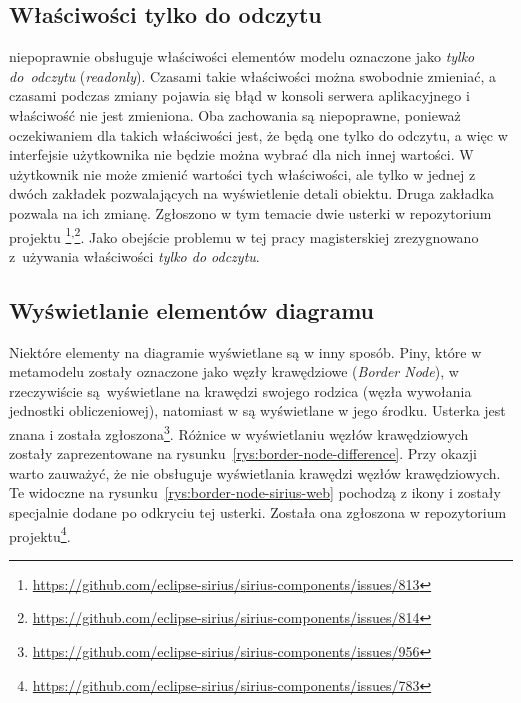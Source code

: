 \subsection{Właściwości tylko do odczytu}

\SiriusWeb{} niepoprawnie obsługuje właściwości elementów modelu oznaczone
jako
\emph{tylko do~odczytu} (\emph{readonly}). Czasami takie właściwości można
swobodnie zmieniać, a czasami podczas zmiany pojawia się błąd w konsoli serwera
aplikacyjnego i właściwość nie jest zmieniona. Oba zachowania są niepoprawne,
ponieważ oczekiwaniem dla takich właściwości jest, że będą one tylko do
odczytu, a więc w interfejsie użytkownika nie będzie można wybrać dla nich
innej wartości. W \SiriusDesktop{} użytkownik nie może zmienić wartości
tych właściwości, ale tylko w jednej z dwóch zakładek pozwalających na
wyświetlenie detali obiektu. Druga zakładka pozwala na ich zmianę.
Zgłoszono w tym temacie dwie usterki w repozytorium
projektu \SiriusWeb{}\footnote{
	\url{https://github.com/eclipse-sirius/sirius-components/issues/813}
}\textsuperscript{,}\footnote{
	\url{https://github.com/eclipse-sirius/sirius-components/issues/814}
}. Jako obejście problemu w tej pracy magisterskiej zrezygnowano z~używania
właściwości \emph{tylko do odczytu}.

\subsection{Wyświetlanie elementów diagramu}

Niektóre elementy na diagramie wyświetlane są w inny sposób. Piny, które w
metamodelu zostały oznaczone jako węzły krawędziowe (\emph{Border Node}), w
\SiriusDesktop{} rzeczywiście są~wyświetlane na krawędzi swojego rodzica
(węzła wywołania jednostki obliczeniowej), natomiast w \SiriusWeb{} są
wyświetlane w jego środku. Usterka jest znana i została zgłoszona\footnote{
	\url{https://github.com/eclipse-sirius/sirius-components/issues/956}
}. Różnice w wyświetlaniu węzłów krawędziowych zostały zaprezentowane na
rysunku~\ref{rys:border-node-difference}.
Przy okazji warto zauważyć, że \SiriusWeb{} nie obsługuje wyświetlania
krawędzi węzłów krawędziowych. Te widoczne na
rysunku~\ref{rys:border-node-sirius-web} pochodzą z ikony i zostały specjalnie
dodane po odkryciu tej usterki. Została ona zgłoszona w repozytorium
projektu\footnote{
	\url{https://github.com/eclipse-sirius/sirius-components/issues/783}}.

